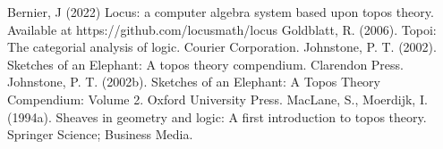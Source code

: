 \documentclass[a4paper,11pt, notitlepage]{report}
\theoremstyle{definition}
\begin{document}
\newline \newline
[11] Bernier, J (2022) Locus: a computer algebra system based upon topos theory. Available at https://github.com/locusmath/locus
\newline \newline
[12] Goldblatt, R. (2006). Topoi: The categorial analysis of logic. Courier Corporation.
\newline \newline
[14] Johnstone, P. T. (2002). Sketches of an Elephant: A topos theory compendium. Clarendon Press.
\newline \newline
[15] Johnstone, P. T. (2002b). Sketches of an Elephant: A Topos Theory Compendium: Volume 2. Oxford University Press.
\newline \newline
[16] MacLane, S., Moerdijk, I. (1994a). Sheaves in geometry and logic: A first introduction to topos theory. Springer Science; Business Media.
\end{document}
